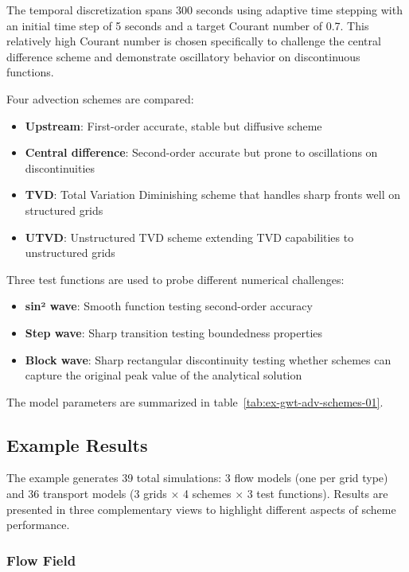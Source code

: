 The temporal discretization spans 300 seconds using adaptive time stepping with an initial time step of 5 seconds and a target Courant number of 0.7. This relatively high Courant number is chosen specifically to challenge the central difference scheme and demonstrate oscillatory behavior on discontinuous functions.

Four advection schemes are compared:
\begin{itemize}
\item \textbf{Upstream}: First-order accurate, stable but diffusive scheme
\item \textbf{Central difference}: Second-order accurate but prone to oscillations on discontinuities
\item \textbf{TVD}: Total Variation Diminishing scheme that handles sharp fronts well on structured grids
\item \textbf{UTVD}: Unstructured TVD scheme extending TVD capabilities to unstructured grids
\end{itemize}

Three test functions are used to probe different numerical challenges:
\begin{itemize}
\item \textbf{sin² wave}: Smooth function testing second-order accuracy
\item \textbf{Step wave}: Sharp transition testing boundedness properties
\item \textbf{Block wave}: Sharp rectangular discontinuity testing whether schemes can capture the original peak value of the analytical solution
\end{itemize}

The model parameters are summarized in table~\ref{tab:ex-gwt-adv-schemes-01}.



\subsection{Example Results}

The example generates 39 total simulations: 3 flow models (one per grid type) and 36 transport models (3 grids $\times$ 4 schemes $\times$ 3 test functions). Results are presented in three complementary views to highlight different aspects of scheme performance.

\subsubsection{Flow Field}

